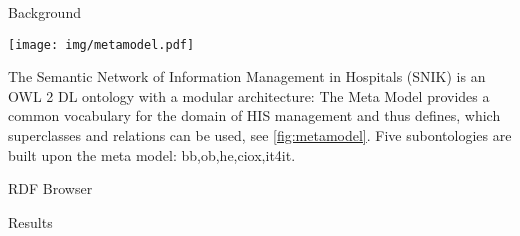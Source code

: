 \documentclass[portrait,final,a0paper,fontscale=0.310]{baposter}
\begin{document}
\begin{poster}
\begin{posterbox}[name=background,column=0,row=0]{Background}

\begin{minipage}{\linewidth}
\centering
{}
\label{fig:metamodel}
\texttt{[image: img/metamodel.pdf]}
\end{minipage}
The Semantic Network of Information Management in Hospitals (SNIK) is an OWL 2 DL ontology with a modular architecture:
The Meta Model provides a common vocabulary for the domain of HIS management and thus defines, which superclasses and relations can be used, see \cref{fig:metamodel}.
Five subontologies are built upon the meta model: bb,ob,he,ciox,it4it.
\vspace{0.3em}
\end{posterbox}
\begin{posterbox}[name=results,below=background]{RDF Browser}
\end{posterbox}
\begin{posterbox}[name=results,below=background]{Results}


\end{posterbox}
\end{poster}
\end{document}

